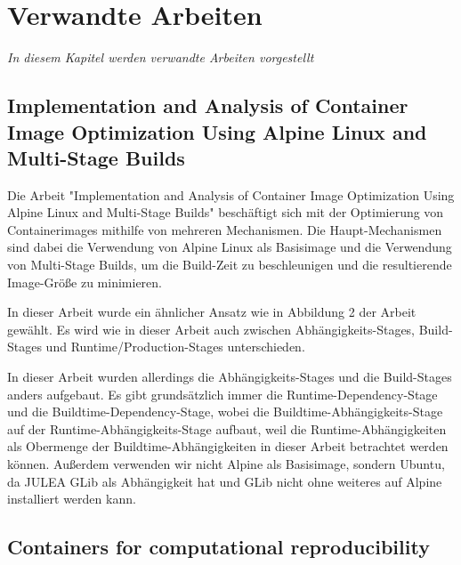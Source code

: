 \chapter{Verwandte Arbeiten}
\label{cha:related-work}
\textit{In diesem Kapitel werden verwandte Arbeiten vorgestellt}

\section{Implementation and Analysis of Container Image Optimization Using Alpine Linux and Multi-Stage Builds \cite{fachrudinImplementationAnalysisContainer2025}}

Die Arbeit "Implementation and Analysis of Container Image Optimization Using Alpine Linux and Multi-Stage Builds" beschäftigt sich mit der Optimierung von Containerimages mithilfe von mehreren Mechanismen. Die Haupt-Mechanismen sind dabei die Verwendung von Alpine Linux als Basisimage und die Verwendung von Multi-Stage Builds, um die Build-Zeit zu beschleunigen und die resultierende Image-Größe zu minimieren. 

In dieser Arbeit wurde ein ähnlicher Ansatz wie in Abbildung 2 \cite[Vgl. S. 11]{fachrudinImplementationAnalysisContainer2025} der Arbeit gewählt. Es wird wie in dieser Arbeit auch zwischen Abhängigkeits-Stages, Build-Stages und Runtime/Production-Stages unterschieden. 


In dieser Arbeit wurden allerdings die Abhängigkeits-Stages und die Build-Stages anders aufgebaut. Es gibt grundsätzlich immer die Runtime-Dependency-Stage und die Buildtime-Dependency-Stage, wobei die Buildtime-Abhängigkeits-Stage auf der Runtime-Abhängigkeits-Stage aufbaut, weil die Runtime-Abhängigkeiten als Obermenge der Buildtime-Abhängigkeiten in dieser Arbeit betrachtet werden können. Außerdem verwenden wir nicht Alpine als Basisimage, sondern Ubuntu, da JULEA GLib als Abhängigkeit hat und GLib nicht ohne weiteres auf Alpine installiert werden kann.

\section{Containers for computational reproducibility \cite{moreauContainersComputationalReproducibility2023}}


